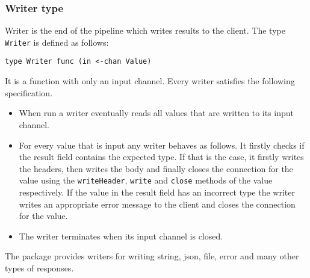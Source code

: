 \documentclass[12pt,a4paper]{article}
\begin{document}
\subsubsection{Writer type}
Writer is the end of the pipeline which writes results to the client.
The type \texttt{Writer} is defined as follows:
\begin{lstlisting}
type Writer func (in <-chan Value)
\end{lstlisting}
It is a function with only an input channel.
Every writer satisfies the following specification.
\begin{itemize}
    \item When run a writer eventually reads all values that are written 
          to its input channel.

	\item For every value that is input any writer behaves as follows. 
          It firstly checks if the result field contains the expected type. 
          If that is the case, it firstly writes the headers, then
          writes the body and finally closes the connection for the value
          using the \texttt{writeHeader}, \texttt{write} and \texttt{close}
          methods of the value respectively. If the value in the result 
          field has an incorrect type the writer writes an appropriate 
          error message to the client and closes the connection for the value. 

	\item The writer terminates when its input channel is closed.
\end{itemize}
The package provides writers for writing string, json, file, error and many
other types of responses.
\end{document}
